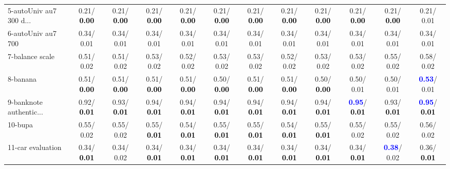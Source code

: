 \begin{table}[h]
\begin{center}
{\begin{tabular}{lc|c|c|c|c|c|c|c|c|c|c}
5-autoUniv au7 300 d... &   0.21/\textcolor{black}{\textbf{  0.00}} &   0.21/\textcolor{black}{\textbf{  0.00}} &   0.21/\textcolor{black}{\textbf{  0.00}} &   0.21/\textcolor{black}{\textbf{  0.00}} &   0.21/\textcolor{black}{\textbf{  0.00}} &   0.21/\textcolor{black}{\textbf{  0.00}} &   0.21/\textcolor{black}{\textbf{  0.00}} &   0.21/\textcolor{black}{\textbf{  0.00}} &   0.21/\textcolor{black}{\textbf{  0.00}} &   0.21/\textcolor{black}{\textbf{  0.00}} &   0.21/  0.01 \\
6-autoUniv au7 700 &   0.34/  0.01 &   0.34/  0.01 &   0.34/  0.01 &   0.34/  0.01 &   0.34/  0.01 &   0.34/  0.01 &   0.34/  0.01 &   0.34/  0.01 &   0.34/  0.01 &   0.34/  0.01 &   0.34/  0.01 \\
7-balance scale &   0.51/  0.02 &   0.51/  0.02 &   0.53/  0.02 &   0.52/  0.02 &   0.53/  0.02 &   0.53/  0.02 &   0.52/  0.02 &   0.53/  0.02 &   0.53/  0.02 &   0.55/  0.02 &   0.58/  0.02 \\ \hline
8-banana &   0.51/\textcolor{black}{\textbf{  0.00}} &   0.51/\textcolor{black}{\textbf{  0.00}} &   0.51/\textcolor{black}{\textbf{  0.00}} &   0.51/\textcolor{black}{\textbf{  0.00}} &   0.50/\textcolor{black}{\textbf{  0.00}} &   0.51/\textcolor{black}{\textbf{  0.00}} &   0.51/\textcolor{black}{\textbf{  0.00}} &   0.50/\textcolor{black}{\textbf{  0.00}} &   0.50/  0.01 &   0.50/  0.01 & \textcolor{blue}{\textbf{  0.53}}/  0.01 \\
9-banknote authentic... &   0.92/\textcolor{black}{\textbf{  0.01}} &   0.93/\textcolor{black}{\textbf{  0.01}} &   0.94/\textcolor{black}{\textbf{  0.01}} &   0.94/\textcolor{black}{\textbf{  0.01}} &   0.94/\textcolor{black}{\textbf{  0.01}} &   0.94/\textcolor{black}{\textbf{  0.01}} &   0.94/\textcolor{black}{\textbf{  0.01}} &   0.94/\textcolor{black}{\textbf{  0.01}} & \textcolor{blue}{\textbf{  0.95}}/\textcolor{black}{\textbf{  0.01}} &   0.93/\textcolor{black}{\textbf{  0.01}} & \textcolor{blue}{\textbf{  0.95}}/\textcolor{black}{\textbf{  0.01}} \\
10-bupa &   0.55/  0.02 &   0.55/  0.02 &   0.55/\textcolor{black}{\textbf{  0.01}} &   0.54/\textcolor{black}{\textbf{  0.01}} &   0.55/\textcolor{black}{\textbf{  0.01}} &   0.55/\textcolor{black}{\textbf{  0.01}} &   0.54/\textcolor{black}{\textbf{  0.01}} &   0.55/\textcolor{black}{\textbf{  0.01}} &   0.55/  0.02 &   0.55/  0.02 &   0.56/  0.02 \\
11-car evaluation &   0.34/\textcolor{black}{\textbf{  0.01}} &   0.34/  0.02 &   0.34/\textcolor{black}{\textbf{  0.01}} &   0.34/\textcolor{black}{\textbf{  0.01}} &   0.34/\textcolor{black}{\textbf{  0.01}} &   0.34/\textcolor{black}{\textbf{  0.01}} &   0.34/\textcolor{black}{\textbf{  0.01}} &   0.34/\textcolor{black}{\textbf{  0.01}} &   0.34/\textcolor{black}{\textbf{  0.01}} & \textcolor{blue}{\textbf{  0.38}}/  0.02 &   0.36/\textcolor{black}{\textbf{  0.01}} \\

\end{tabular}}
\end{center}
\end{table}
